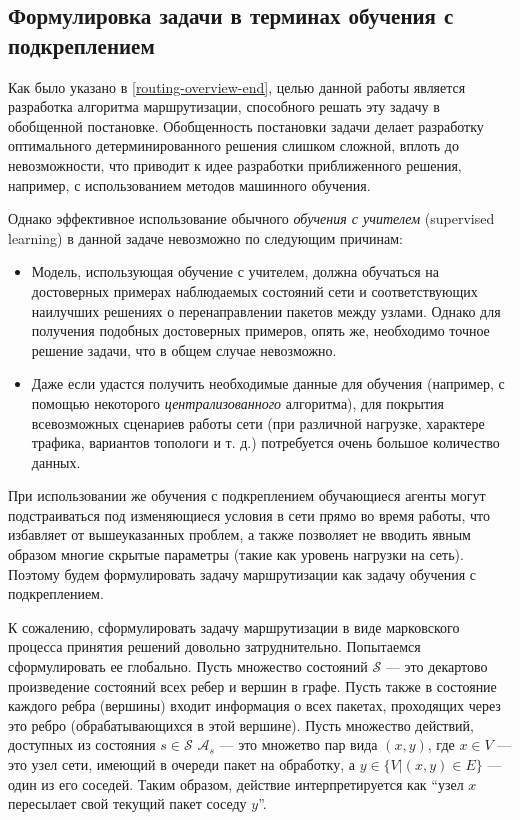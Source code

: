 \documentclass[specification,annotation,times]{itmo-student-thesis}
\theoremstyle{definition}
\begin{document}
\subsection{Формулировка задачи в терминах обучения с подкреплением}\label{rl-task-formulation}

Как было указано в \ref{routing-overview-end}, целью данной работы является
разработка алгоритма маршрутизации, способного решать эту задачу в обобщенной
постановке. Обобщенность постановки задачи делает разработку оптимального
детерминированного решения слишком сложной, вплоть до невозможности, что
приводит к идее разработки приближенного решения, например, с использованием
методов машинного обучения.

Однако эффективное использование обычного \textit{обучения с учителем} (supervised
learning) в данной задаче невозможно по следующим причинам:

\begin{itemize}
  \item Модель, использующая обучение с учителем, должна обучаться на
    достоверных примерах наблюдаемых состояний сети и соответствующих наилучших
    решениях о перенаправлении пакетов между узлами. Однако для получения
    подобных достоверных примеров, опять же, необходимо точное решение задачи,
    что в общем случае невозможно.
  \item Даже если удастся получить необходимые данные для обучения (например,
    с помощью некоторого \textit{централизованного} алгоритма), для покрытия
    всевозможных сценариев работы сети (при различной нагрузке, характере
    трафика, вариантов топологи и т. д.) потребуется очень большое количество данных.
\end{itemize}

При использовании же обучения с подкреплением обучающиеся агенты могут
подстраиваться под изменяющиеся условия в сети прямо во время работы, что
избавляет от вышеуказанных проблем, а также позволяет не вводить явным образом
многие скрытые параметры (такие как уровень нагрузки на сеть). Поэтому будем
формулировать задачу маршрутизации как задачу обучения с подкреплением.

К сожалению, сформулировать задачу маршрутизации в виде марковского процесса
принятия решений довольно затруднительно. Попытаемся сформулировать ее
глобально. Пусть множество состояний $\mathcal{S}$ --- это декартово произведение
состояний всех ребер и вершин в графе. Пусть также в состояние каждого ребра
(вершины) входит информация о всех пакетах, проходящих через это ребро
(обрабатывающихся в этой вершине). Пусть множество действий, доступных из
состояния $s \in \mathcal{S}$ $\mathcal{A}_s$ --- это множетво пар вида $(x,y)$,
где $x \in V$ --- это узел сети, имеющий в очереди пакет на обработку, а
$y \in \{V | (x, y) \in E\}$ --- один из его соседей. Таким образом, действие
интерпретируется как \enquote{узел $x$ пересылает свой текущий пакет соседу $y$}.
\end{document}
